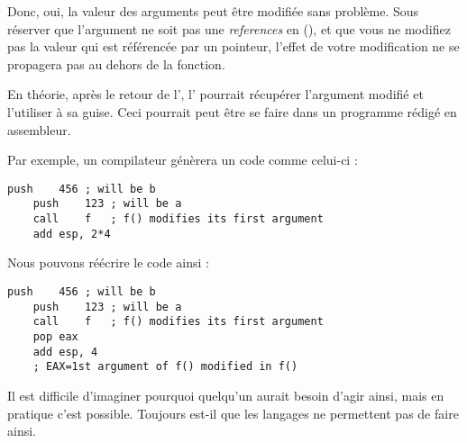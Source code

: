 


Donc, oui, la valeur des arguments peut être modifiée sans problème.
Sous réserver que l'argument ne soit pas une \emph{references} en \Cpp{} (),
et que vous ne modifiez pas la valeur qui est référencée par un pointeur, l'effet de votre modification
ne se propagera pas au dehors de la fonction.

En théorie, après le retour de l', l' pourrait récupérer l'argument modifié et
l'utiliser à sa guise.
Ceci pourrait peut être se faire dans un programme rédigé en assembleur.

Par exemple, un compilateur \CCpp génèrera un code comme celui-ci :

\begin{lstlisting}[style=customasmx86]
	push	456	; will be b
	push	123	; will be a
	call	f	; f() modifies its first argument
	add	esp, 2*4
\end{lstlisting}

Nous pouvons réécrire le code ainsi :

\begin{lstlisting}[style=customasmx86]
	push	456	; will be b
	push	123	; will be a
	call	f	; f() modifies its first argument
	pop	eax
	add	esp, 4
	; EAX=1st argument of f() modified in f()
\end{lstlisting}

Il est difficile d'imaginer pourquoi quelqu'un aurait besoin d'agir ainsi, mais en pratique
c'est possible.
Toujours est-il que les langages \CCpp ne permettent pas de faire ainsi.



%

